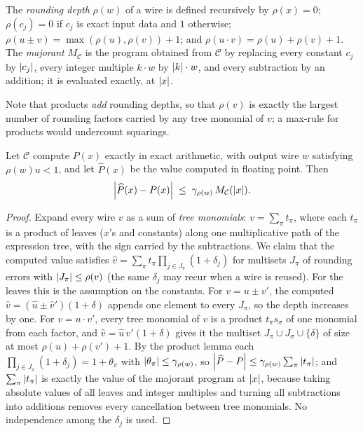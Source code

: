 \begin{definition}
\label{def:rounding-depth}
The \emph{rounding depth} $\rho(w)$ of a wire is defined recursively by
$\rho(x)=0$; $\rho(c_j)=0$ if $c_j$ is exact input data and $1$ otherwise;
$\rho(u\pm v)=\max(\rho(u),\rho(v))+1$; and $\rho(u\cdot v)=\rho(u)+\rho(v)+1$.
The \emph{majorant} $M_{\mathcal C}$ is the program obtained from $\mathcal C$
by replacing every constant $c_j$ by $\left\lvert c_j\right\rvert$, every integer multiple
$k\cdot w$ by $\left\lvert k\right\rvert\cdot w$, and every subtraction by an addition; it is
evaluated exactly, at $\left\lvert x\right\rvert$.
\end{definition}

Note that products \emph{add} rounding depths, so that $\rho(v)$ is exactly the
largest number of rounding factors carried by any tree monomial of $v$; a
max-rule for products would undercount squarings.

\begin{theorem}
\label{thm:majorant-bound}
Let $\mathcal C$ compute $P(x)$ exactly in exact arithmetic, with output wire
$w$ satisfying $\rho(w)u<1$, and let $\widehat P(x)$ be the value computed in
floating point.  Then
\[
  \left\lvert \widehat P(x)-P(x)\right\rvert\;\le\;\gamma_{\rho(w)}\,M_{\mathcal C}(\left\lvert x\right\rvert).
\]
\end{theorem}

\begin{proof}
Expand every wire $v$ as a sum of \emph{tree monomials}: $v=\sum_\pi t_\pi$,
where each $t_\pi$ is a product of leaves ($x$'s and constants) along one
multiplicative path of the expression tree, with the sign carried by the
subtractions.  We claim that the computed value satisfies
$\widehat v=\sum_\pi t_\pi\prod_{j\in J_\pi}(1+\delta_j)$ for multisets
$J_\pi$ of rounding errors with $\left\lvert J_\pi\right\rvert\le\rho(v)$ (the same $\delta_j$
may recur when a wire is reused).  For the leaves this is the assumption on
the constants.  For $v=u\pm v'$, the computed
$\widehat v=(\widehat u\pm\widehat v')(1+\delta)$ appends one element to every
$J_\pi$, so the depth increases by one.  For $v=u\cdot v'$, every tree
monomial of $v$ is a product $t_\pi s_\sigma$ of one monomial from each
factor, and $\widehat v=\widehat u\,\widehat v'(1+\delta)$ gives it the
multiset $J_\pi\cup J_\sigma\cup\{\delta\}$ of size at most
$\rho(u)+\rho(v')+1$.  By the product lemma each
$\prod_{j\in J_\pi}(1+\delta_j)=1+\theta_\pi$ with
$\left\lvert \theta_\pi\right\rvert\le\gamma_{\rho(w)}$, so
$\left\lvert \widehat P-P\right\rvert\le\gamma_{\rho(w)}\sum_\pi\left\lvert t_\pi\right\rvert$; and
$\sum_\pi\left\lvert t_\pi\right\rvert$ is exactly the value of the majorant program at
$\left\lvert x\right\rvert$, because taking absolute values of all leaves and integer multiples
and turning all subtractions into additions removes every cancellation between
tree monomials.  No independence among the $\delta_j$ is used.
\end{proof}

